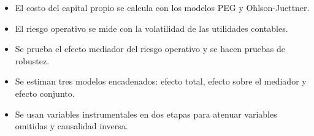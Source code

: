 \documentclass{article}
\newcommand{\cardtitlesize}{\fontsize{35.4}{42.5}\selectfont}
\newcommand{\cardtitle}[2][navy]{{\color{#1}\cardtitlesize\bfseries\textls[110]{\MakeUppercase{#2}}}\par\vspace{7mm}}
\begin{document}
\vfill
\hspace*{34mm}\begin{minipage}{773mm}
\begin{tcolorbox}[card]\cardtitle{Metodología}
\begin{minipage}[t]{0.48\linewidth}
\begin{itemize}
\item El costo del capital propio se calcula con los modelos PEG y Ohlson-Juettner.
\item El riesgo operativo se mide con la volatilidad de las utilidades contables.
\item Se prueba el efecto mediador del riesgo operativo y se hacen pruebas de robustez.
\end{itemize}
\end{minipage}\hfill
\begin{minipage}[t]{0.48\linewidth}
\begin{itemize}
\item Se estiman tres modelos encadenados: efecto total, efecto sobre el mediador y efecto conjunto.
\item Se usan variables instrumentales en dos etapas para atenuar variables omitidas y causalidad inversa.
\end{itemize}
\end{minipage}
\end{tcolorbox}
\end{minipage}
\end{document}
